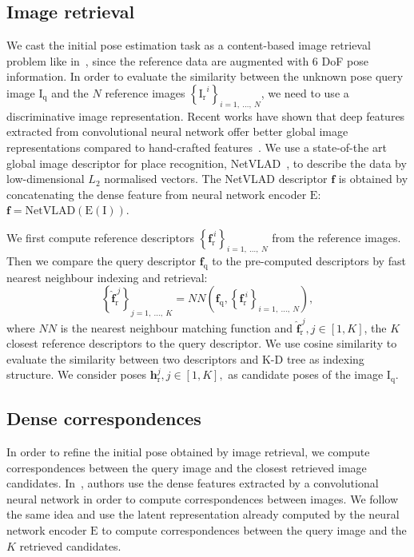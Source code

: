 \subsection{Image retrieval}
\label{subsec:image_indexing}

We cast the initial pose estimation task as a content-based image retrieval problem like in~\cite{Balntas2018}, since the reference data are augmented with 6 DoF pose information. In order to evaluate the similarity between the unknown pose query image $\mathrm{I_{q}}$ and the $N$ reference images $\left\{\mathrm{I_{r}}^{i} \right\}_{i=1,\ \ldots ,\ N}$, we need to use a discriminative image representation. Recent works have shown that deep features extracted from convolutional neural network offer better global image representations compared to hand-crafted features~\cite{Razavian2014a, Arandjelovic2017, Gordo2017, Radenovic2017}. We use a state-of-the art global image descriptor for place recognition, NetVLAD~\cite{Arandjelovic2017}, to describe the data by low-dimensional $L_2$ normalised vectors. The NetVLAD descriptor $\mathbf{f}$ is obtained by concatenating the dense feature from neural network encoder $\mathrm{E}$: $\mathbf{f} = \mathrm{NetVLAD}(\mathrm{E}(\mathrm{I}))$.

We first compute reference descriptors $\left\{ \mathbf{f}_{\mathrm{r}}^{\ i} \right\}_{i=1,\ \ldots ,\ N}$ from the reference images. Then we compare the query descriptor $\mathbf{f}_{\mathrm{q}}$ to the pre-computed descriptors by fast nearest neighbour indexing and retrieval:
\begin{equation}
	\left\{ \mathbf{\hat{f}}_{\mathrm{r}}^{\ j} \right\}_{j=1,\ \ldots ,\ K} = NN \left( \mathbf{f}_{\mathrm{q}}, \left\{ \mathbf{f}_{\mathrm{r}}^{\ i} \right\}_{i=1,\ \ldots ,\ N} \right),
\end{equation}
where $NN$ is the nearest neighbour matching function and $\mathbf{\hat{f}}_{\mathrm{r}}^{\ j}, j \in [1, K]$, the $K$ closest reference descriptors to the query descriptor. We use cosine similarity to evaluate the similarity between two descriptors and K-D tree as indexing structure. We consider poses $\mathbf{h}_\mathrm{r}^j, j \in [1, K],$ as candidate poses of the image $\mathrm{I_q}$.

\subsection{Dense correspondences}
\label{subsec:matching}

In order to refine the initial pose obtained by image retrieval, we compute correspondences between the query image and the closest retrieved image candidates. In~\citep{Taira2018, Noh2017, Widya2018}, authors use the dense features extracted by a convolutional neural network in order to compute correspondences between images. We follow the same idea and use the latent representation already computed by the neural network encoder $\mathrm{E}$ to compute correspondences between the query image and the $K$ retrieved candidates.

